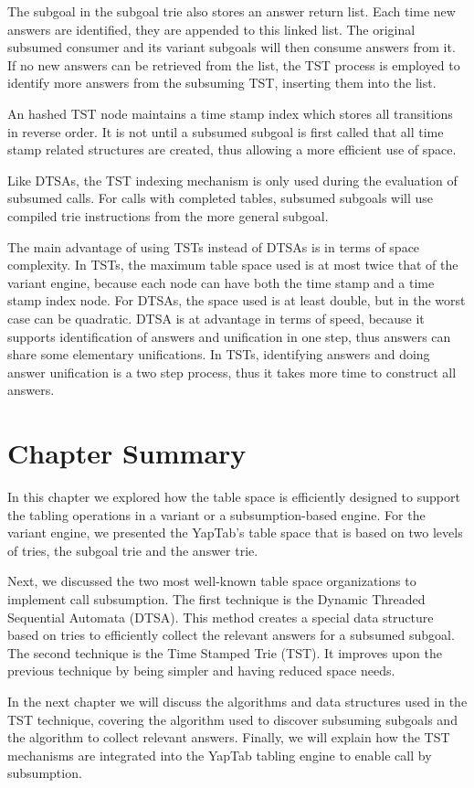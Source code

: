 The subgoal in the subgoal trie also stores an answer return list. Each time new answers are identified, they are appended
to this linked list. The original subsumed consumer and its variant subgoals will then consume answers from it. If no
new answers can be retrieved from the list, the TST process is employed to identify more answers from the subsuming TST,
inserting them into the list.

An hashed TST node maintains a time stamp index which stores all transitions in reverse order.
It is not until a subsumed subgoal is first called that all time stamp related structures are created, thus
allowing a more efficient use of space.

Like DTSAs, the TST indexing mechanism is only used during the evaluation of subsumed calls.
For calls with completed tables, subsumed subgoals will use compiled trie instructions from the more general subgoal.

The main advantage of using TSTs instead of DTSAs is in terms of space complexity. In TSTs, the maximum table space
used is at most twice that of the variant engine, because each node can have both the time stamp and a time stamp index node.
For DTSAs, the space used is at least double, but in the worst
case can be quadratic. DTSA is at advantage in terms of speed, because it supports identification of answers and
unification in one step, thus answers can share some elementary unifications. In TSTs, identifying answers
and doing answer unification is a two step process, thus it takes more time to construct all answers. 

\section{Chapter Summary}

In this chapter we explored how the table space is efficiently designed to support
the tabling operations in a variant or a subsumption-based engine.
For the variant engine, we presented the YapTab's table space that is based on two levels
of tries, the subgoal trie and the answer trie.

Next, we discussed the two most well-known table space organizations to implement call subsumption.
The first technique is the Dynamic Threaded Sequential Automata (DTSA). This method creates a special data
structure based on tries to efficiently collect the relevant answers for a subsumed subgoal.
The second technique is the Time Stamped Trie (TST). It improves upon the previous technique by
being simpler and having reduced space needs.

In the next chapter we will discuss the algorithms and data structures used in the TST technique,
covering the algorithm used to discover subsuming subgoals and the algorithm to collect relevant
answers. Finally, we will explain how the TST mechanisms are integrated into the YapTab tabling engine to enable
call by subsumption.
